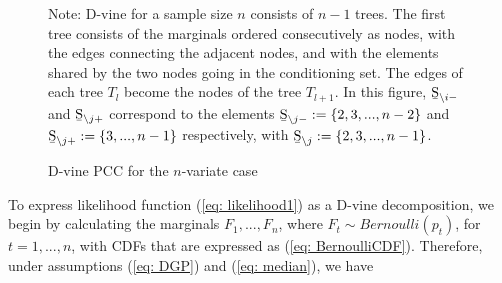 \documentclass[harvard,11pt]{article}
\begin{document}
\begin{figure}[hbtp!]
\caption{D-vine PCC for the $n$-variate case}
\begin{center}
\end{center}
\doublespacing
Note: D-vine for a sample size $n$ consists of $n-1$ trees. The first tree consists of the marginals ordered consecutively as nodes, with the edges connecting the adjacent nodes, and with the elements shared by the two nodes going in the conditioning set. The edges of each tree $T_l$ become the nodes of the tree $T_{l+1}$. In this figure, $\text{\b{S}}_{\backslash i-}$ and  $\text{\b{S}}_{\backslash j+}$ correspond to the elements $\text{\b{S}}_{\backslash j-}:=\{2,3,...,n-2\}$ and $\text{\b{S}}_{\backslash j+}:=\{3,...,n-1\}$ respectively, with $\text{\b{S}}_{\backslash j}:=\{2,3,...,n-1\}$.
\label{fig: D-vineC3}
\end{figure}
To express likelihood function (\ref{eq: likelihood1}) as a D-vine decomposition, we begin by calculating the marginals $F_1,...,F_n$, where $F_t\sim Bernoulli(p_t)$, for $t=1,...,n$, with CDFs that are expressed as (\ref{eq: BernoulliCDF}). Therefore, under assumptions (\ref{eq: DGP}) and (\ref{eq: median}), we have
\end{document}

